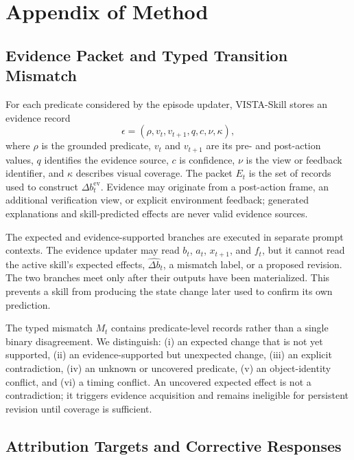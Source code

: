 \section{Appendix of Method}

\subsection{Evidence Packet and Typed Transition Mismatch}
\label{sec:evidence_packet}

For each predicate considered by the episode updater, VISTA-Skill stores an evidence record
\begin{equation}
    \epsilon=
    (\rho,v_t,v_{t+1},q,c,\nu,\kappa),
\end{equation}
where $\rho$ is the grounded predicate, $v_t$ and $v_{t+1}$ are its pre- and post-action values, $q$ identifies the evidence source, $c$ is confidence, $\nu$ is the view or feedback identifier, and $\kappa$ describes visual coverage. The packet $E_t$ is the set of records used to construct $\Delta b_t^{\mathrm{ev}}$. Evidence may originate from a post-action frame, an additional verification view, or explicit environment feedback; generated explanations and skill-predicted effects are never valid evidence sources.

The expected and evidence-supported branches are executed in separate prompt contexts. The evidence updater may read $b_t$, $a_t$, $x_{t+1}$, and $f_t$, but it cannot read the active skill's expected effects, $\widehat{\Delta b}_t$, a mismatch label, or a proposed revision. The two branches meet only after their outputs have been materialized. This prevents a skill from producing the state change later used to confirm its own prediction.

The typed mismatch $M_t$ contains predicate-level records rather than a single binary disagreement. We distinguish: (i) an expected change that is not yet supported, (ii) an evidence-supported but unexpected change, (iii) an explicit contradiction, (iv) an unknown or uncovered predicate, (v) an object-identity conflict, and (vi) a timing conflict. An uncovered expected effect is not a contradiction; it triggers evidence acquisition and remains ineligible for persistent revision until coverage is sufficient.

\subsection{Attribution Targets and Corrective Responses}
\label{sec:attribution_responses}


